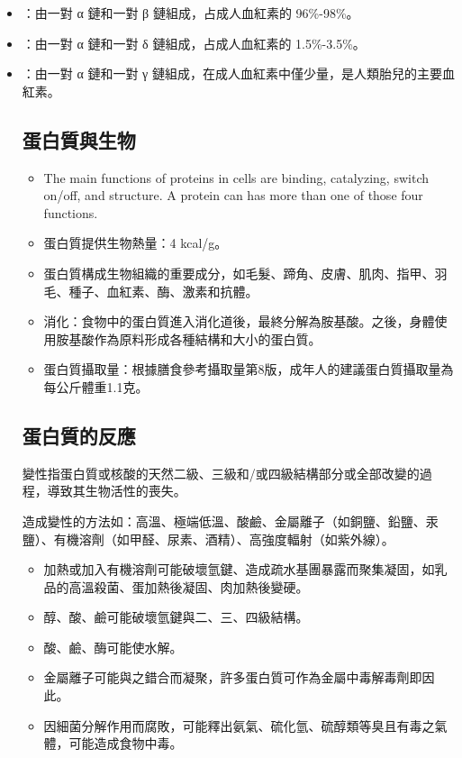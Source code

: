 \documentclass[a4paper,12pt]{report}
\begin{document}
\begin{itemize}
\begin{itemize}
哺乳動物中血紅素占紅血球乾重的97\%、總重的35\%。

人類的主要血紅素：
\bit
\item {}：由一對 α 鏈和一對 β 鏈組成，占成人血紅素的 96\%-98\%。
\item {}：由一對 α 鏈和一對 δ 鏈組成，占成人血紅素的 1.5\%-3.5\%。
\item {}：由一對 α 鏈和一對 γ 鏈組成，在成人血紅素中僅少量，是人類胎兒的主要血紅素。 
\eit
\subsection{蛋白質與生物}
\begin{itemize}
\item The main functions of proteins in cells are binding, catalyzing, switch on/off, and structure. A protein can has more than one of those four functions.
\item 蛋白質提供生物熱量：4 kcal/g。
\item 蛋白質構成生物組織的重要成分，如毛髮、蹄角、皮膚、肌肉、指甲、羽毛、種子、血紅素、酶、激素和抗體。
\item 消化：食物中的蛋白質進入消化道後，最終分解為胺基酸。之後，身體使用胺基酸作為原料形成各種結構和大小的蛋白質。
\item 蛋白質攝取量：根據膳食參考攝取量第8版，成年人的建議蛋白質攝取量為每公斤體重1.1克。
\end{itemize}
\subsection{蛋白質的反應}
變性指蛋白質或核酸的天然二級、三級和/或四級結構部分或全部改變的過程，導致其生物活性的喪失。

造成變性的方法如：高溫、極端低溫、酸鹼、金屬離子（如銅鹽、鉛鹽、汞鹽）、有機溶劑（如甲醛、尿素、酒精）、高強度輻射（如紫外線）。
\begin{itemize}
\item 加熱或加入有機溶劑可能破壞氫鍵、造成疏水基團暴露而聚集凝固，如乳品的高溫殺菌、蛋加熱後凝固、肉加熱後變硬。
\item 醇、酸、鹼可能破壞氫鍵與二、三、四級結構。
\item 酸、鹼、酶可能使水解。
\item 金屬離子可能與之錯合而凝聚，許多蛋白質可作為金屬中毒解毒劑即因此。
\item 因細菌分解作用而腐敗，可能釋出氨氣、硫化氫、硫醇類等臭且有毒之氣體，可能造成食物中毒。
\end{itemize}

\end{itemize}
\end{itemize}
\end{document}
